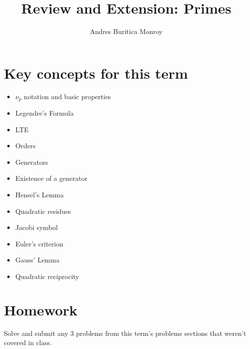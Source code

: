 \documentclass{article}
\title{Review and Extension: Primes}
\author{Andres Buritica Monroy}
\date{}
\begin{document}
\maketitle
\section{Key concepts for this term}
\begin{itemize}
	\item $\nu_p$ notation and basic properties
	\item Legendre's Formula
	\item LTE
	\item Orders
	\item Generators
	\item Existence of a generator
	\item Hensel's Lemma
	\item Quadratic residues
	\item Jacobi symbol
	\item Euler's criterion
	\item Gauss' Lemma
	\item Quadratic reciprocity
\end{itemize}
\section{Homework}
Solve and submit any 3 problems from this term's problems sections that weren't
covered in class.
\end{document}

